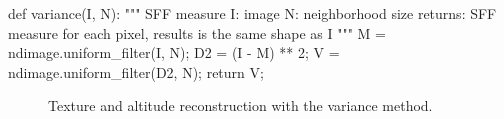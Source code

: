 \begin{python}
def variance(I, N):
    """
    SFF measure
    I: image
    N: neighborhood size
    returns: SFF measure for each pixel, results is the same shape as I
    """
    M = ndimage.uniform_filter(I, N);
    D2 = (I - M) ** 2;
    V = ndimage.uniform_filter(D2, N);
    return V;
\end{python}

\begin{figure}[htbp]
	\centering\caption{Texture and altitude reconstruction with the variance method.}%
	\hfill{}\hfill\hfill
	\hfill\null
	
	\hfill{}\hfill\hfill
	\hfill\null%
	\label{fig:sff:python:variance}%
	\vspace*{-8pt}%
\end{figure}

